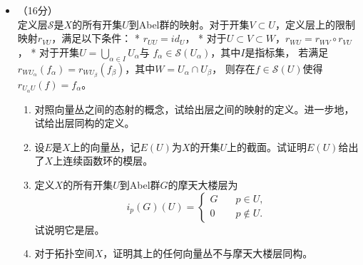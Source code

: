 \begin{itemize}
    \item[5.]
    （16分）\\
    定义层$\mathcal{S}$是$X$的所有开集$U$到Abel群的映射。对于开集$V \subset U$，定义层上的限制映射$r_{VU}$，满足以下条件：
    * $r_{UU}=id_U$，
    * 对于$U\subset V\subset W$，$r_{WU}=r_{WV}\circ r_{VU}$，
    * 对于开集$U=\bigcup\limits_{\alpha\in I}U_{\alpha}$与
    $f_\alpha \in \mathcal{S}(U_{\alpha})$，其中$I$是指标集，
    若满足$r_{WU_\alpha}(f_{\alpha})=r_{WU_\beta}(f_{\beta})$，其中$W=U_\alpha\cap U_\beta$，
    则存在$f \in \mathcal{S}(U)$使得$r_{U_\alpha U}(f)=f_\alpha$。

    \begin{enumerate}
        \item[(1)]对照向量丛之间的态射的概念，试给出层之间的映射的定义。进一步地，试给出层同构的定义。
        \item[(2)]设$E$是$X$上的向量丛，记$E(U)$为$X$的开集$U$上的截面。试证明$E(U)$给出了$X$上连续函数环的模层。
        \item[(3)]定义$X$的所有开集$U$到Abel群$G$的摩天大楼层为
        \begin{equation*}
            i_p(G)(U)=\left\{
        \begin{aligned}
            G \quad & p\in U,\\
            0 \quad & p\notin U.
        \end{aligned}
        \right.
        \end{equation*}
试说明它是层。
        \item[(4)]对于拓扑空间$X$，证明其上的任何向量丛不与摩天大楼层同构。
    \end{enumerate}

\end{itemize}